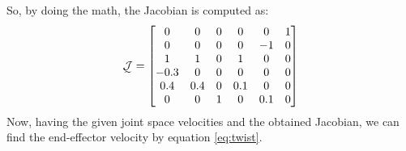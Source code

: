 \documentclass[conference]{IEEEtran}
\begin{document}
So, by doing the math, the Jacobian is computed as:
\begin{align*}
    \undertilde{\mathcal{J}} = \begin{bmatrix}
                                   0    & 0   & 0 & 0   & 0   & 1 \\
                                   0    & 0   & 0 & 0   & -1  & 0 \\
                                   1    & 1   & 0 & 1   & 0   & 0 \\
                                   -0.3 & 0   & 0 & 0   & 0   & 0 \\
                                   0.4  & 0.4 & 0 & 0.1 & 0   & 0 \\
                                   0    & 0   & 1 & 0   & 0.1 & 0 \\
                               \end{bmatrix}
\end{align*}
Now, having the given joint space velocities and the obtained Jacobian, we can find the end-effector velocity by equation \ref{eq:twist}.
\end{document}
